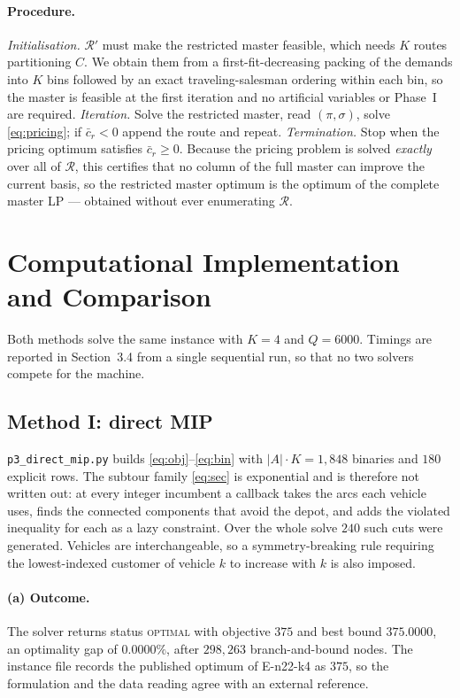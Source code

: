 \documentclass[11pt]{article}
\begin{document}
\paragraph{Procedure.}
\emph{Initialisation.} $\mathcal{R}'$ must make the restricted master
feasible, which needs $K$ routes partitioning $C$. We obtain them from
a first-fit-decreasing packing of the demands into $K$ bins followed by
an exact traveling-salesman ordering within each bin, so the master is
feasible at the first iteration and no artificial variables or Phase~I
are required. \emph{Iteration.} Solve the restricted master, read
$(\pi,\sigma)$, solve \eqref{eq:pricing}; if $\bar{c}_r < 0$ append the
route and repeat. \emph{Termination.} Stop when the pricing optimum
satisfies $\bar{c}_r \ge 0$. Because the pricing problem is solved
\emph{exactly} over all of $\mathcal{R}$, this certifies that no column
of the full master can improve the current basis, so the restricted
master optimum is the optimum of the complete master LP --- obtained
without ever enumerating $\mathcal{R}$.

\section{Computational Implementation and Comparison}

Both methods solve the same instance with $K = 4$ and $Q = 6000$.
Timings are reported in Section~3.4 from a single sequential run, so
that no two solvers compete for the machine.

\subsection{Method I: direct MIP}

\texttt{p3\_direct\_mip.py} builds \eqref{eq:obj}--\eqref{eq:bin} with
$|A| \cdot K = 1{,}848$ binaries and $180$ explicit rows. The subtour
family \eqref{eq:sec} is exponential and is therefore not written out:
at every integer incumbent a callback takes the arcs each vehicle uses,
finds the connected components that avoid the depot, and adds the
violated inequality for each as a lazy constraint. Over the whole solve
$240$ such cuts were generated. Vehicles are interchangeable, so a
symmetry-breaking rule requiring the lowest-indexed customer of
vehicle $k$ to increase with $k$ is also imposed.

\paragraph{(a) Outcome.} The solver returns status \textsc{optimal}
with objective $375$ and best bound $375.0000$, an optimality gap of
$0.0000\%$, after $298{,}263$ branch-and-bound nodes. The instance file
records the published optimum of E-n22-k4 as $375$, so the formulation
and the data reading agree with an external reference.
\end{document}
